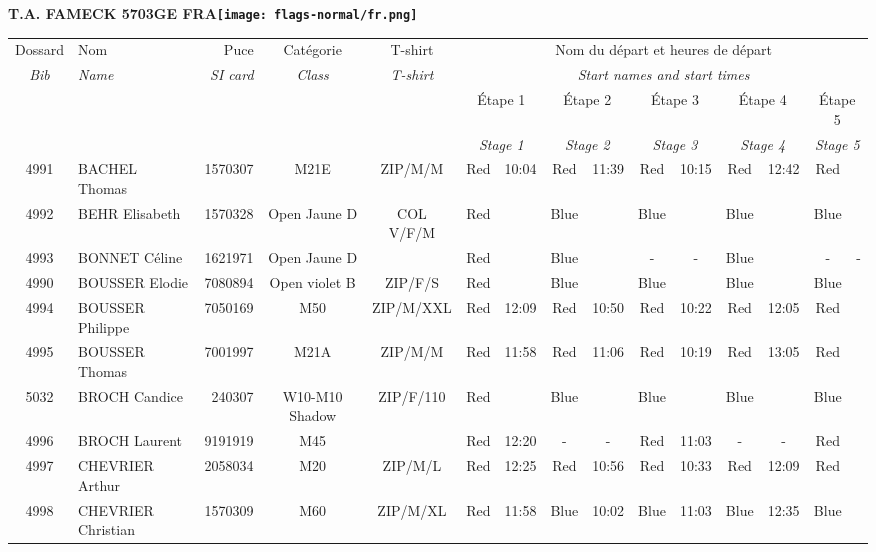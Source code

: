 \documentclass{report}
\begin{document}
\newpage
  \Huge \centering \bfseries T.A. FAMECK 5703GE FRA\normalfont \footnotesize \sffamily \hfill \texttt{[image: flags-normal/fr.png]} \newline 
  \begin{longtable}{|c|l|r|c|c|*{5}{cc|}}
    Dossard & Nom  & Puce    & Catégorie & T-shirt & \multicolumn{10}{c|}{Nom du départ et heures de départ} \\
    \itshape Bib     & \itshape Name & \itshape SI card & \itshape Class  & \itshape  T-shirt  & \multicolumn{10}{c|}{\itshape Start names and start times} \\
    \hline
    & & & & & \multicolumn{2}{c|}{Étape 1} & \multicolumn{2}{c|}{Étape 2} & \multicolumn{2}{c|}{Étape 3} & \multicolumn{2}{c|}{Étape 4} & \multicolumn{2}{c|}{Étape 5} \\
    & & & & & \multicolumn{2}{c|}{\itshape Stage 1} & \multicolumn{2}{c|}{\itshape Stage 2} & \multicolumn{2}{c|}{\itshape Stage 3} & \multicolumn{2}{c|}{\itshape Stage 4} & \multicolumn{2}{c|}{\itshape Stage 5} \\
    \hline
    4991 & BACHEL Thomas & 1570307 & M21E & ZIP/M/M & Red & 10:04 & Red & 11:39 & Red & 10:15 & Red & 12:42 & Red &  \\
    4992 & BEHR Elisabeth & 1570328 & Open Jaune D & COL V/F/M & Red &   & Blue &   & Blue &   & Blue &   & Blue &  \\
    4993 & BONNET Céline & 1621971 & Open Jaune D &   & Red &   & Blue &   & - &  - & Blue &   & - &  -\\
    4990 & BOUSSER Elodie & 7080894 & Open violet B & ZIP/F/S & Red &   & Blue &   & Blue &   & Blue &   & Blue &  \\
    4994 & BOUSSER Philippe & 7050169 & M50 & ZIP/M/XXL & Red & 12:09 & Red & 10:50 & Red & 10:22 & Red & 12:05 & Red &  \\
    4995 & BOUSSER Thomas & 7001997 & M21A & ZIP/M/M & Red & 11:58 & Red & 11:06 & Red & 10:19 & Red & 13:05 & Red &  \\
    5032 & BROCH Candice & 240307 & W10-M10 Shadow & ZIP/F/110 & Red &   & Blue &   & Blue &   & Blue &   & Blue &  \\
    4996 & BROCH Laurent & 9191919 & M45 &   & Red & 12:20 & - &  - & Red & 11:03 & - &  - & Red &  \\
    4997 & CHEVRIER Arthur & 2058034 & M20 & ZIP/M/L & Red & 12:25 & Red & 10:56 & Red & 10:33 & Red & 12:09 & Red &  \\
    4998 & CHEVRIER Christian & 1570309 & M60 & ZIP/M/XL & Red & 11:58 & Blue & 10:02 & Blue & 11:03 & Blue & 12:35 & Blue &  \\

\end{longtable}
\end{document}
